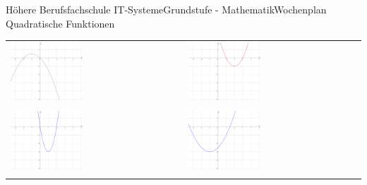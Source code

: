 \documentclass[oneside,openany,headings=optiontotoc,11pt,numbers=noenddot]{scrreprt}
\begin{document}
\begin{worksheet}{Höhere Berufsfachschule IT-Systeme}{Grundstufe - Mathematik}{Wochenplan Quadratische Funktionen}
\begin{framed}
\begin{tabularx}{\textwidth}{XX}
				\includegraphics[width=0.43\textwidth]{../99_Bilder/WP/WP7FrD.png} & \includegraphics[width=0.43\textwidth]{../99_Bilder/WP/WP7FrE.png}\\
				\\
				\includegraphics[width=0.43\textwidth]{../99_Bilder/WP/WP7FrF.png} & \includegraphics[width=0.43\textwidth]{../99_Bilder/WP/WP7FrB.png}\\
				\\

\end{tabularx}
\end{framed}
\end{worksheet}
\end{document}
